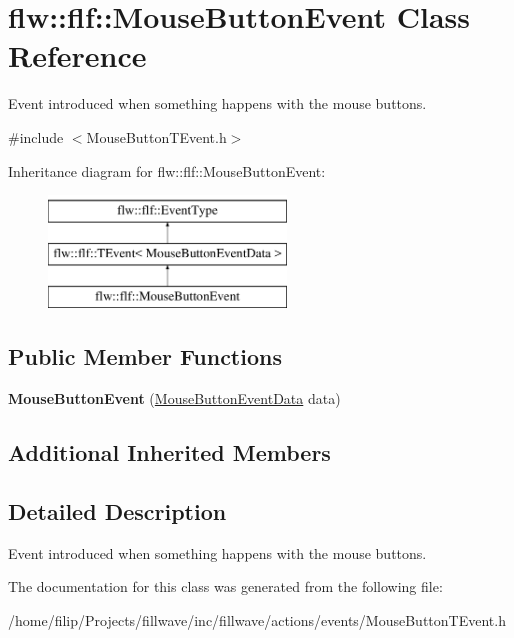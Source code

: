 \hypertarget{classflw_1_1flf_1_1MouseButtonEvent}{}\section{flw\+:\+:flf\+:\+:Mouse\+Button\+Event Class Reference}
\label{classflw_1_1flf_1_1MouseButtonEvent}


Event introduced when something happens with the mouse buttons.  




{\ttfamily \#include $<$Mouse\+Button\+T\+Event.\+h$>$}

Inheritance diagram for flw\+:\+:flf\+:\+:Mouse\+Button\+Event\+:\begin{figure}[H]
\begin{center}
\leavevmode
\includegraphics[height=3.000000cm]{classflw_1_1flf_1_1MouseButtonEvent}
\end{center}
\end{figure}
\subsection*{Public Member Functions}
\begin{DoxyCompactItemize}
\item 
{\bfseries Mouse\+Button\+Event} (\hyperlink{structflw_1_1flf_1_1MouseButtonEventData}{Mouse\+Button\+Event\+Data} data)\hypertarget{classflw_1_1flf_1_1MouseButtonEvent_a4eb2ce424b4711c37246d9fba41c0cb1}{}\label{classflw_1_1flf_1_1MouseButtonEvent_a4eb2ce424b4711c37246d9fba41c0cb1}

\end{DoxyCompactItemize}
\subsection*{Additional Inherited Members}


\subsection{Detailed Description}
Event introduced when something happens with the mouse buttons. 

The documentation for this class was generated from the following file\+:\begin{DoxyCompactItemize}
\item 
/home/filip/\+Projects/fillwave/inc/fillwave/actions/events/Mouse\+Button\+T\+Event.\+h\end{DoxyCompactItemize}

